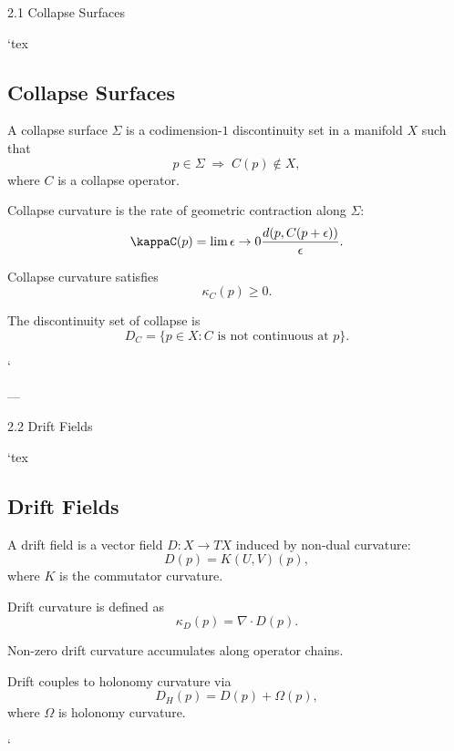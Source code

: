 2.1 Collapse Surfaces

`tex
\subsection{Collapse Surfaces}

\begin{definition}
A collapse surface $\Sigma$ is a codimension-$1$ discontinuity set in a manifold
$X$ such that
\[
p \in \Sigma \;\Rightarrow\; C(p) \notin X,
\]
where $C$ is a collapse operator.
\end{definition}

\begin{definition}
Collapse curvature is the rate of geometric contraction along $\Sigma$:
\[
\kappaC(p) = \lim{\epsilon \to 0} \frac{d(p, C(p+\epsilon))}{\epsilon}.
\]
\end{definition}

\begin{axiom}
Collapse curvature satisfies
\[
\kappa_C(p) \ge 0.
\]
\end{axiom}

\begin{definition}
The discontinuity set of collapse is
\[
D_C = \{ p \in X : C \text{ is not continuous at } p \}.
\]
\end{definition}
`

---

2.2 Drift Fields

`tex
\subsection{Drift Fields}

\begin{definition}
A drift field is a vector field $D : X \to TX$ induced by non-dual curvature:
\[
D(p) = K(U,V)(p),
\]
where $K$ is the commutator curvature.
\end{definition}

\begin{definition}
Drift curvature is defined as
\[
\kappa_D(p) = \nabla \cdot D(p).
\]
\end{definition}

\begin{axiom}
Non-zero drift curvature accumulates along operator chains.
\end{axiom}

\begin{definition}
Drift couples to holonomy curvature via
\[
D_H(p) = D(p) + \Omega(p),
\]
where $\Omega$ is holonomy curvature.
\end{definition}
`

